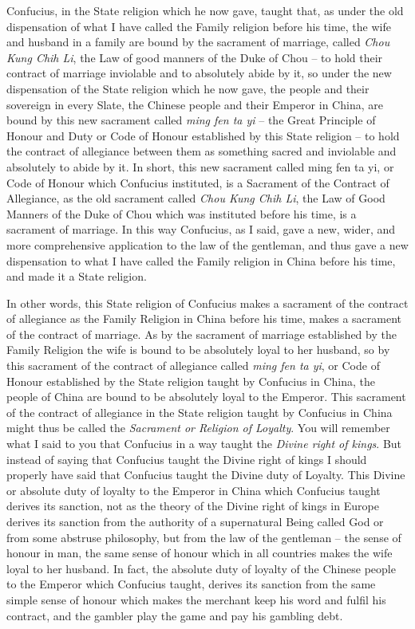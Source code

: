 Confucius, in the State religion which he now gave, taught that, as under the old dispensation of what I have called the Family religion before his time, the wife and husband in a family are bound by the sacrament of marriage, called \emph{Chou Kung Chih Li}, the Law of good manners of the Duke of Chou -- to hold their contract of marriage inviolable and to absolutely abide by it, so under the new dispensation of the State religion which he now gave, the people and their sovereign in every Slate, the Chinese people and their Emperor in China, are bound by this new sacrament called \emph{ming fen ta yi} --  the Great Principle of Honour and Duty or Code of Honour established by this State religion -- to hold the contract of allegiance between them as something sacred and inviolable and absolutely to abide by it. In short, this new sacrament called ming fen ta yi, or Code of Honour which Confucius instituted, is a Sacrament of the Contract of Allegiance, as the old sacrament called \emph{Chou Kung Chih Li}, the Law of Good Manners of the Duke of Chou which was instituted before his time, is a sacrament of marriage. In this way Confucius, as I said, gave a new, wider, and more comprehensive application to the law of the gentleman, and thus gave a new dispensation to what I have called the Family religion in China before his time, and made it a State religion.

In other words, this State religion of Confucius makes a sacrament of the contract of allegiance as the Family Religion in China before his time,
makes a sacrament of the contract of marriage.
As by the sacrament of marriage established by the Family Religion the wife is bound to be absolutely loyal to her husband,
so by this sacrament of the contract of allegiance called \emph{ming fen ta yi},
or Code of Honour established by the State religion taught by Confucius in China,
the people of China are bound to be absolutely loyal to the Emperor.
This sacrament of the contract of allegiance in the State religion taught by Confucius in China might thus be called the \emph{Sacrament or Religion of Loyalty}.
You will remember what I said to you that Confucius in a way taught
the \emph{Divine right of kings}.
But instead of saying that Confucius taught the Divine right of kings I should properly have said that Confucius taught the Divine duty of Loyalty.
This Divine or absolute duty of loyalty to the Emperor in China which Confucius taught derives its sanction,
not as the theory of the Divine right of kings in Europe derives its sanction from the authority of a supernatural Being called God or from some abstruse philosophy,
but from the law of the gentleman
-- the sense of honour in man, the same sense of honour which in all countries makes the wife loyal to her husband.
In fact, the absolute duty of loyalty of the Chinese people to the Emperor which Confucius taught,
derives its sanction from the same simple sense of honour which makes the merchant keep his word and fulfil his contract,
and the gambler play the game and pay his gambling debt.

